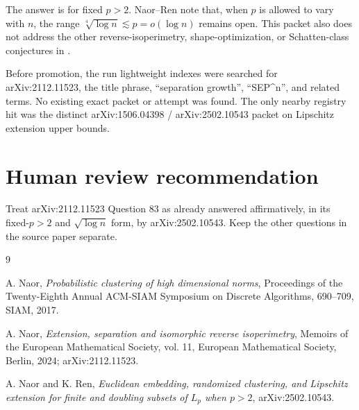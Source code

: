 \documentclass[11pt]{article}
\begin{document}
The answer is for fixed \(p>2\).  Naor--Ren note that, when \(p\) is allowed
to vary with \(n\), the range
\(\sqrt[4]{\log n}\lesssim p=o(\log n)\) remains open.  This packet also does
not address the other reverse-isoperimetry, shape-optimization, or
Schatten-class conjectures in \cite{Naor2024}.

Before promotion, the run lightweight indexes were searched for arXiv:2112.11523,
the title phrase, ``separation growth'', ``SEP\^{}n'', and related terms.  No
existing exact packet or attempt was found.  The only nearby registry hit was
the distinct arXiv:1506.04398 / arXiv:2502.10543 packet on Lipschitz extension
upper bounds.

\section*{Human review recommendation}

Treat arXiv:2112.11523 Question 83 as already answered affirmatively, in its
fixed-\(p>2\) and \(\sqrt{\log n}\) form, by arXiv:2502.10543.  Keep the other
questions in the source paper separate.

\begin{thebibliography}{9}

A. Naor,
\emph{Probabilistic clustering of high dimensional norms},
Proceedings of the Twenty-Eighth Annual ACM-SIAM Symposium on Discrete
Algorithms, 690--709, SIAM, 2017.

A. Naor,
\emph{Extension, separation and isomorphic reverse isoperimetry},
Memoirs of the European Mathematical Society, vol. 11,
European Mathematical Society, Berlin, 2024; arXiv:2112.11523.

A. Naor and K. Ren,
\emph{Euclidean embedding, randomized clustering, and Lipschitz extension for
finite and doubling subsets of \(L_p\) when \(p>2\)},
arXiv:2502.10543.

\end{thebibliography}
\end{document}
